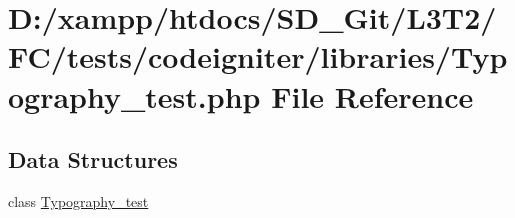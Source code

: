 \hypertarget{_typography__test_8php}{}\section{D\+:/xampp/htdocs/\+S\+D\+\_\+\+Git/\+L3\+T2/\+F\+C/tests/codeigniter/libraries/\+Typography\+\_\+test.php File Reference}
\label{_typography__test_8php}
\subsection*{Data Structures}
\begin{DoxyCompactItemize}
\item 
class \hyperlink{class_typography__test}{Typography\+\_\+test}
\end{DoxyCompactItemize}
